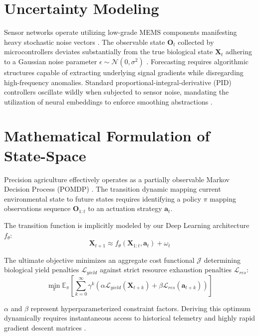\documentclass[12pt, a4paper]{report}
\begin{document}
\section{Uncertainty Modeling}
Sensor networks operate utilizing low-grade MEMS components manifesting heavy stochastic noise vectors \cite{r7}. The observable state $\mathbf{O}_t$ collected by microcontrollers deviates substantially from the true biological state $\mathbf{X}_t$ adhering to a Gaussian noise parameter $\epsilon \sim \mathcal{N}(0, \sigma^2)$ \cite{r8}. Forecasting requires algorithmic structures capable of extracting underlying signal gradients while disregarding high-frequency anomalies. Standard proportional-integral-derivative (PID) controllers oscillate wildly when subjected to sensor noise, mandating the utilization of neural embeddings to enforce smoothing abstractions \cite{r9}.

\section{Mathematical Formulation of State-Space}
Precision agriculture effectively operates as a partially observable Markov Decision Process (POMDP) \cite{r10}. The transition dynamic mapping current environmental state to future states requires identifying a policy $\pi$ mapping observations sequence $\mathbf{O}_{1:t}$ to an actuation strategy $\mathbf{a}_t$.

The transition function is implicitly modeled by our Deep Learning architecture $f_\theta$:
\begin{equation}
    \mathbf{X}_{t+1} \approx f_\theta(\mathbf{X}_{1:t}, \mathbf{a}_t) + \omega_t
\end{equation}

The ultimate objective minimizes an aggregate cost functional $\mathcal{J}$ determining biological yield penalties $\mathcal{L}_{yield}$ against strict resource exhaustion penalties $\mathcal{L}_{res}$:
\begin{equation}
    \min_{\pi} \mathbb{E}_{\pi} \left[ \sum_{k=0}^{\infty} \gamma^k \left( \alpha \mathcal{L}_{yield}(\mathbf{X}_{t+k}) + \beta \mathcal{L}_{res}(\mathbf{a}_{t+k}) \right) \right]
\end{equation}

$\alpha$ and $\beta$ represent hyperparameterized constraint factors. Deriving this optimum dynamically requires instantaneous access to historical telemetry and highly rapid gradient descent matrices \cite{r11}.

\end{document}
